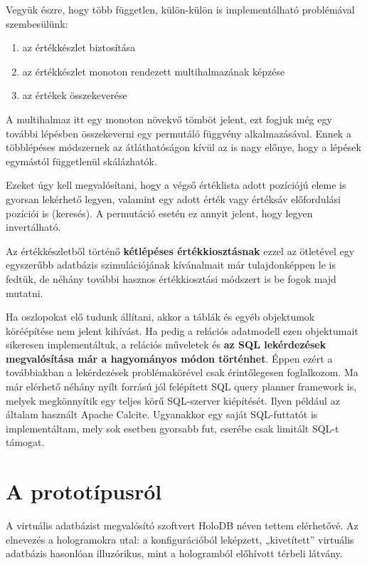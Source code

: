 \documentclass[
    parspace,
    noindent,
    nohyp,
]{elteiktdk}[2023/04/10]
\begin{document}
Vegyük észre, hogy több független, külön-külön is implementálható problémával szembesülünk:

\begin{enumerate}
    \item az értékkészlet biztosítása
    \item az értékkészlet monoton rendezett multihalmazának képzése
    \item az értékek összekeverése
\end{enumerate}

A multihalmaz itt egy monoton növekvő tömböt jelent,
ezt fogjuk még egy további lépésben összekeverni egy permutáló függvény alkalmazásával.
Ennek a többlépéses módszernek az átláthatóságon kívül az is nagy előnye,
hogy a lépések egymástól függetlenül skálázhatók.

Ezeket úgy kell megvalósítani, hogy a végső értéklista adott pozíciójú eleme is gyorsan lekérhető legyen,
valamint egy adott érték vagy értéksáv előfordulási pozíciói is
(keresés).
A permutáció esetén ez annyit jelent, hogy legyen invertálható.

Az értékkészletből történő \textbf{kétlépéses értékkiosztásnak} ezzel az ötletével
egy egyszerűbb adatbázis szimulációjának kívánalmait már tulajdonképpen le is fedtük,
de néhány további hasznos értékkiosztási módszert is be fogok majd mutatni.

Ha oszlopokat elő tudunk állítani,
akkor a táblák és egyéb objektumok köréépítése nem jelent kihívást.
Ha pedig a relációs adatmodell ezen objektumait sikeresen implementáltuk,
a relációs műveletek és \textbf{az SQL lekérdezések megvalósítása már a hagyományos módon történhet}.
Éppen ezért a továbbiakban a lekérdezések problémakörével csak érintőlegesen foglalkozom.
Ma már elérhető néhány nyílt forrású jól felépített SQL query planner framework is,
melyek megkönnyítik egy teljes körű SQL-szerver kiépítését.
Ilyen például az általam használt Apache Calcite.
Ugyanakkor egy saját SQL-futtatót is implementáltam, mely sok esetben gyorsabb fut,
cserébe csak limitált SQL-t támogat.


\section{A prototípusról}

A virtuális adatbázist megvalósító szoftvert HoloDB néven tettem elérhetővé.
Az elnevezés a hologramokra utal:
a konfigurációból leképzett, „kivetített” virtuális adatbázis hasonlóan illuzórikus,
mint a hologramból előhívott térbeli látvány.
\end{document}
